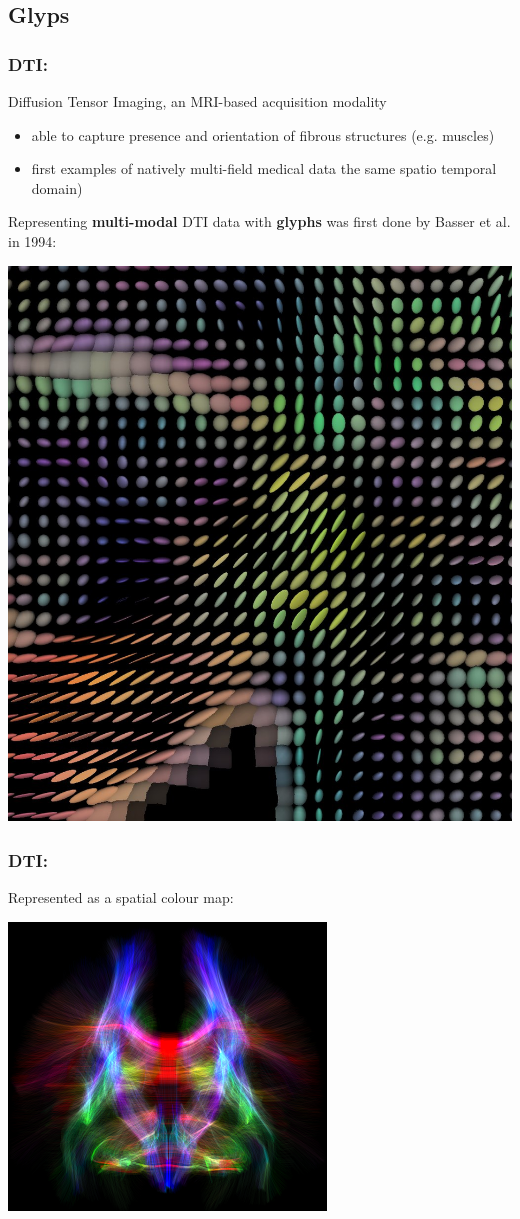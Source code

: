 \documentclass{beamer}
\begin{document}
\subsection{Glyps}
\begin{frame}
	\frametitle{DTI:} %
	Diffusion Tensor Imaging, an MRI-based acquisition modality
	\begin{itemize}
		\item able to capture presence and orientation of fibrous structures
(e.g. muscles)
		\item first examples of natively multi-field medical data %
the same spatio temporal domain)
	\end{itemize}
	Representing \textbf{multi-modal} DTI data with \textbf{glyphs} was first
	done by Basser et al. in 1994:
	\begin{center}
		\includegraphics[width=.4\textwidth]{images/dti}
	\end{center}
\end{frame}

\begin{frame}
	\frametitle{DTI:}
	Represented as a spatial colour map:
	\begin{center}
		\includegraphics[width=.6\textwidth]{images/tractography}
	\end{center}
\end{frame}
\end{document}
